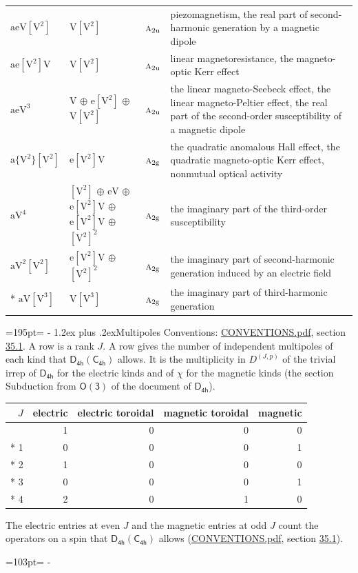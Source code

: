 \documentclass[10pt,a4paper]{article}
\makeatletter
\renewcommand\section{\@startsection{section}{1}{\z@}{-3ex plus -1ex minus -.2ex}%
  {1.2ex plus .2ex}{\normalfont\large\sffamily\bfseries\color{parttitle}}}
\newcommand{\needspace}[1]{\par\penalty-100\begingroup\dimen0=#1\relax\dimen2=\pagegoal
  \advance\dimen2-\pagetotal\ifdim\dimen0>\dimen2\relax\ifdim\dimen2>0pt\vfil\break\fi\fi
  \endgroup}
\numberwithin{equation}{section}
\newcommand{\grp}[1]{\mathsf{#1}}
\newcommand{\irr}[1]{\text{\normalfont\scshape #1}}
\newcommand{\ptag}[1]{\mathrm{#1}}
\newcommand{\irrJp}[2]{D^{(#1,#2)}}
\newcommand{\jahn}[1]{\mathrm{#1}}
\newlength{\fillwidth}\newlength{\cellwidth}\newlength{\colwidth}
\makeatother
\begin{document}
{\begin{longtable}{@{}lll>{\RaggedRight\arraybackslash}p{\fillwidth}@{}}
$\jahn{aeV[V^{2}]}$ & $\jahn{V[V^{2}]}$ & $\irr{a}_{2\ptag{u}}$ & piezomagnetism, the real part of second-harmonic generation by a magnetic dipole\\
$\jahn{ae[V^{2}]V}$ & $\jahn{V[V^{2}]}$ & $\irr{a}_{2\ptag{u}}$ & linear magnetoresistance, the magneto-optic Kerr effect\\
$\jahn{aeV^{3}}$ & $\jahn{V}$ $\oplus$ $\jahn{e[V^{2}]}$ $\oplus$ $\jahn{V[V^{2}]}$ & $\irr{a}_{2\ptag{u}}$ & the linear magneto-Seebeck effect, the linear magneto-Peltier effect, the real part of the second-order susceptibility of a magnetic dipole\\
$\jahn{a\{V^{2}\}[V^{2}]}$ & $\jahn{e[V^{2}]V}$ & $\irr{a}_{2\ptag{g}}$ & the quadratic anomalous Hall effect, the quadratic magneto-optic Kerr effect, nonmutual optical activity\\
$\jahn{aV^{4}}$ & $\jahn{[V^{2}]}$ $\oplus$ $\jahn{eV}$ $\oplus$ $\jahn{e[V^{2}]V}$ $\oplus$ $\jahn{e[V^{2}]V}$ $\oplus$ $\jahn{[V^{2}]^{2}}$ & $\irr{a}_{2\ptag{g}}$ & the imaginary part of the third-order susceptibility\\
$\jahn{aV^{2}[V^{2}]}$ & $\jahn{e[V^{2}]V}$ $\oplus$ $\jahn{[V^{2}]^{2}}$ & $\irr{a}_{2\ptag{g}}$ & the imaginary part of second-harmonic generation induced by an electric field\\*
$\jahn{aV[V^{3}]}$ & $\jahn{V[V^{3}]}$ & $\irr{a}_{2\ptag{g}}$ & the imaginary part of third-harmonic generation\\
\bottomrule\end{longtable}}
\needspace{195pt}
\section{Multipoles}\label{s:multipoles}
Conventions: \href{../../CONVENTIONS.pdf}{CONVENTIONS.pdf}, section \href{../../CONVENTIONS.pdf\#conv.35.1}{35.1}.
A row is a rank $J$. \label{n:head.multipole.electric}\label{n:head.multipole.electric.toroidal}\label{n:head.multipole.magnetic.toroidal}\label{n:head.multipole.magnetic}A row gives the number of independent multipoles of each kind that $\grp{D_{4h}}(\grp{C_{4h}})$ allows. It is the multiplicity in $\irrJp{J}{p}$ of the trivial irrep of $\grp{D_{4h}}$ for the electric kinds and of $\chi$ for the magnetic kinds (the section Subduction from $\grp{O(3)}$ of the document of \href{../../../rotation/data/pdf/D4h.pdf}{$\grp{D_{4h}}$}).
{\small\begin{longtable}{@{}rrrrr@{}}\toprule
$J$ & electric & electric toroidal & magnetic toroidal & magnetic\\\midrule\endhead
\bottomrule\endfoot\endlastfoot
0 & 1 & 0 & 0 & 0\\*
1 & 0 & 0 & 0 & 1\\*
2 & 1 & 0 & 0 & 0\\*
3 & 0 & 0 & 0 & 1\\*
4 & 2 & 0 & 1 & 0\\
\bottomrule\end{longtable}}
The electric entries at even $J$ and the magnetic entries at odd $J$ count the operators on a spin that $\grp{D_{4h}}(\grp{C_{4h}})$ allows (\href{../../CONVENTIONS.pdf}{CONVENTIONS.pdf}, section \href{../../CONVENTIONS.pdf\#conv.35.1}{35.1}).
\needspace{103pt}
\end{document}
